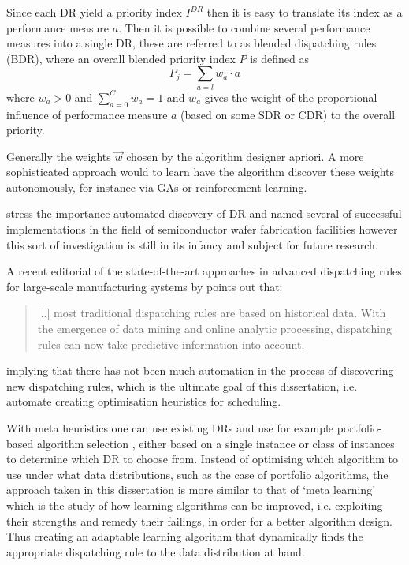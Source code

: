 \documentclass[smallextended]{svjour3}
\begin{document}
Since each DR yield a priority index $I^{DR}$ then it is easy to translate its index as a  performance measure $a$. Then it is possible to combine several performance measures into a single DR, these are referred to as blended dispatching rules (BDR), where an overall blended priority index $P$ is defined as 
\begin{equation}
P_j = \sum_{a=l} w_a \cdot a 
\end{equation}
where $w_a>0$ and $\sum_{a=0}^C w_a = 1$ and $w_a$ gives the weight of the proportional influence of performance measure $a$ (based on some SDR or CDR) to the overall priority.

Generally the weights $\vec{w}$ chosen by the algorithm designer apriori. 
A more sophisticated approach would to learn have the algorithm discover these weights autonomously, for instance via GAs or reinforcement learning. 

\cite{Monch13} stress the importance automated discovery of DR and named several of successful implementations in the field of semiconductor wafer fabrication facilities however this sort of investigation is still in its infancy and subject for future research.

A recent editorial of the state-of-the-art approaches in advanced dispatching rules for large-scale manufacturing systems by \citet{Chen13} points out that:
\begin{quote}
[..] most traditional dispatching rules are based on historical data. With the emergence of data mining and online analytic processing, dispatching rules can now take predictive information into account.
\end{quote}
implying that there has not been much automation in the process of discovering new dispatching rules, which is the ultimate goal of this dissertation, i.e. automate creating optimisation heuristics for scheduling. 

With meta heuristics one can use existing DRs and use for example portfolio-based algorithm selection \citep{Rice76,Gomes01}, either based on a single instance or class of instances \citep{Xu07} to determine which DR to choose from. 
Instead of optimising which algorithm to use under what data distributions, such as the case of portfolio algorithms, the approach taken in this dissertation is more similar to that of `meta learning' \citep{Vilalta02} which is the study of how learning algorithms can be improved, i.e. exploiting their strengths and remedy their failings, in order for a better algorithm design. Thus creating an adaptable learning algorithm that dynamically finds the appropriate dispatching rule  to the data distribution at hand. 
\end{document}
